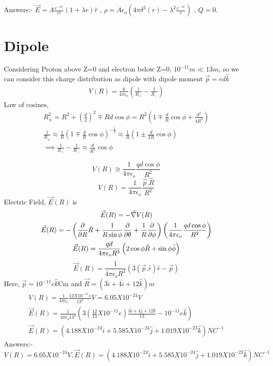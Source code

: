 \documentclass[11pt, a4paper]{article}
\begin{document}
Answers:- \(\vec{E} = A \frac{e^{-\lambda r}}{r^2} (1 + \lambda r)\hat{r}\) , \(\rho = A\epsilon_o \left( 4 \pi \delta^3(r) -  \lambda^2\frac{e^{-\lambda r}}{r}\right)\) , \(Q = 0\).
\newpage
\section{Dipole}
Considering Proton above Z=0 and electron below Z=0, \(10^{-11}m \ll 13m  \), so we can consider this charge distribution as dipole with dipole moment \(\vec{p} = ed \hat{k} \) 
\begin{gather}
    V(R) = \frac{q}{4 \pi \epsilon_{o} }\left(\frac{1}{R_+}-\frac{1}{R_-}\right)
\end{gather}
Law of cosines, 
\begin{gather}
    R_\pm^2 = R^2 + (\frac{d}{2})^2 \mp Rd\cos \phi = R^2(1\mp \frac{d}{R}\cos\phi + \frac{d^2}{4 R^2})\\
    \frac{1}{R_\pm} \approx \frac{1}{R}\left(1\mp \frac{d}{R}\cos\phi\right)^{-\frac{1}{2}} \approx \frac{1}{R}\left(1\pm \frac{d}{2R}\cos\phi\right)\\
    \implies \frac{1}{R_+} - \frac{1}{R_-} \approx \frac{d}{
        R^2}\cos\phi
\end{gather}

\begin{equation}
    V(R) \cong \frac{1}{4\pi \epsilon_{o} } \frac{qd\cos\phi}{R^2}
\end{equation}
\begin{equation}
    \boxed{V(R) = \frac{1}{4\pi \epsilon_{o} } \frac{\vec{p}.\hat{R}}{R^2}}
\end{equation}
Electric Field, \(\vec{E}(R)\) is
\begin{gather}
    \vec{E}(R) = -\vec{\nabla}V(R)\\
    \vec{E}(R) = -\left(\pdv{}{R}\hat{R} +\frac{1}{R \sin \phi}\pdv{}{\theta}+\frac{1}{R}\pdv{}{\phi}\right)\left(\frac{1}{4\pi \epsilon_{o} }\frac{qd\cos\phi}{R^2}\right)\\
    \vec{E}(R) = \frac{qd}{4\pi \epsilon_{o} R^3} \left(2 \cos\phi \hat{R} + \sin \phi \hat{\phi}  \right)
\end{gather}
\begin{equation}
    \boxed{\vec{E}(R) = \frac{1}{4 \pi \epsilon_{o} R^3}\left(3(\vec{p}.\hat{r})\hat{r} -\vec{p} \right)}
\end{equation}
Here, \(\vec{p} = 10^{-11} e \hat{k} \)Cm  and \(\vec{R} = (3 \hat{i} + 4 \hat{i}+12 \hat{k})m \)  
\begin{gather}
    V(R) = \frac{1}{4\pi \epsilon_{o} } \frac{12 X 10^{-11} e }{13^2}V = 6.05 X 10^{-24} V  \\
    \vec{E} (R)= \frac{1}{4 \pi \epsilon_{o} 13^3}(3(\frac{12}{13}X10^{-11}e)\frac{3 \hat{i} + 4 \hat{j} +12 \hat{k} }{13} - 10^{-11}e \hat{k}   )\\
    \vec{E}(R) = (4.188X10^{-24}\hat{i}+ 5.585X10^{-24} \hat{j}+1.019 X 10^{-23} \hat{k} )NC^{-1}  
\end{gather}
Answers:- \(\boxed{V(R) =6.05 X 10^{-24} V,\vec{E}(R)=  (4.188X10^{-24}\hat{i}+ 5.585X10^{-24} \hat{j}+1.019 X 10^{-23} \hat{k} )NC^{-1} }\)
\newpage
\end{document}
